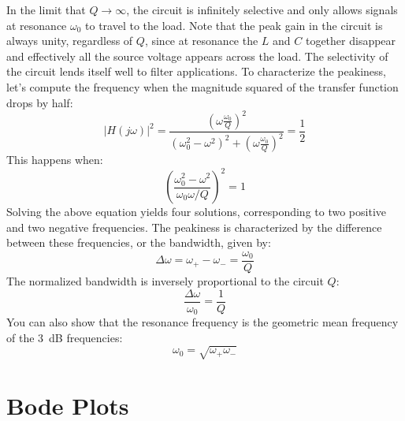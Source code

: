 In the limit that $Q \rightarrow \infty$, the circuit is infinitely selective and only allows signals at resonance $\omega_0$ to travel to the load.  Note that the peak gain in the circuit is always unity, regardless of $Q$, since at resonance the $L$ and $C$ together disappear and effectively all the source voltage appears across the load.  The selectivity of the circuit lends itself well to filter applications.  To characterize the peakiness, let's compute the frequency when the magnitude squared of the transfer function drops by half:
    \begin{equation}
        | H(j\omega)|^2 = \frac{ \left(\omega \frac{\omega_0}{Q} \right)^2}{\left( \omega_0^2 - \omega^2\right)^2 + \left( \omega \frac{\omega_0}{Q}\right)^2} = \frac{1}{2}
    \end{equation}
This happens when:
    \begin{equation}
        \left( \frac{\omega_0^2 - \omega^2}{\omega_0\omega / Q}\right)^2 = 1
    \end{equation}
Solving the above equation yields four solutions, corresponding to two positive and two negative frequencies.  The peakiness is characterized by the difference between these frequencies, or the bandwidth, given by:
    \begin{equation} \label{eq:3db}
        \Delta\omega = \omega_+ - \omega_- = \frac{\omega_0}{Q}
    \end{equation}
The normalized bandwidth is inversely proportional to the circuit $Q$:
    \begin{equation}
        \frac{\Delta\omega}{\omega_0} =\frac{1}{Q}
    \end{equation}
You can also show that the resonance frequency is the geometric mean frequency of the $3$~dB frequencies:
    \begin{equation}
        \omega_0 = \sqrt{\omega_+ \omega_-}
    \end{equation}
\section{Bode Plots}
